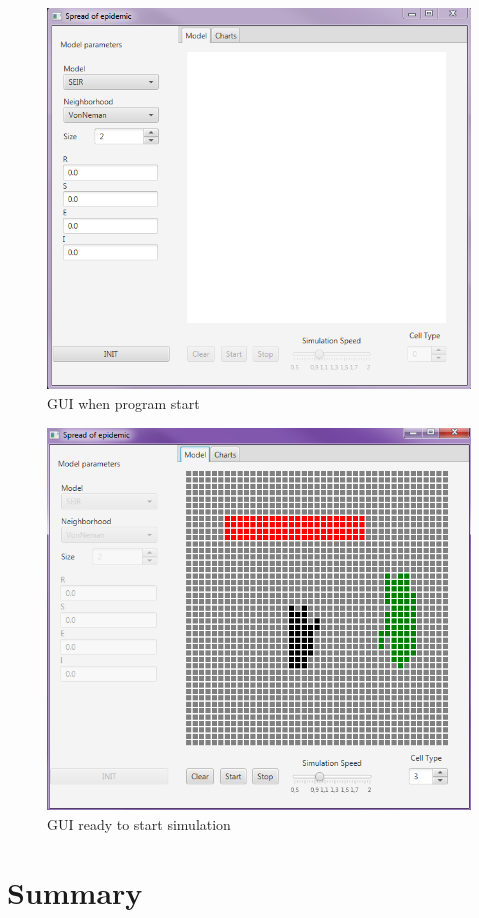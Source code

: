 \documentclass[a4paper, 11pt]{article}
\begin{document}
\begin{figure}[H]
\includegraphics[scale=0.7]{GUI2.PNG} 
\caption{GUI when program start}
\end{figure}
\begin{figure}[H]
\includegraphics[scale=0.7]{GUI3.PNG} 
\caption{GUI ready to start simulation}
\end{figure}
\section{Summary}
%
\printbibliography
\end{document}
